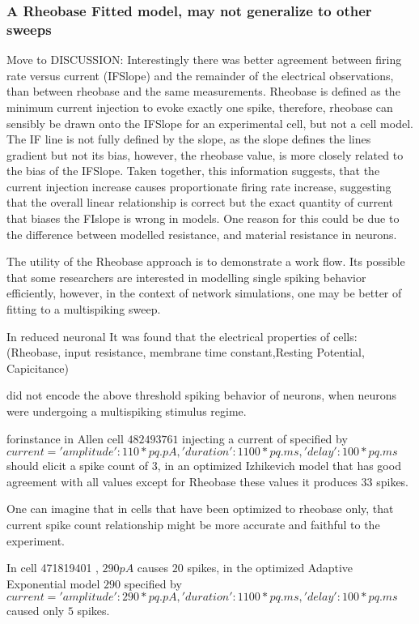 
\subsubsection{A Rheobase Fitted model, may not generalize to other sweeps}
Move to DISCUSSION: Interestingly there was better agreement between firing rate versus current (IFSlope) and the remainder of the electrical observations, than between rheobase and the same measurements. Rheobase is defined as the minimum current injection to evoke exactly one spike, therefore, rheobase can sensibly be drawn onto the IFSlope for an experimental cell, but not a cell model. The IF line is not fully defined by the slope, as the slope defines the lines gradient but not its bias, however, the rheobase value, is more closely related to the bias of the IFSlope. Taken together, this information suggests, that the current injection increase causes proportionate firing rate increase, suggesting that the overall linear relationship is correct but the exact quantity of current that biases the FIslope  is wrong in models. One reason for this could be due to the difference between modelled resistance, and material resistance in neurons.

The utility of the Rheobase approach is to demonstrate a work flow. Its possible that some researchers are interested in modelling single spiking behavior efficiently, however, in the context of network simulations, one may be better of fitting to a multispiking sweep.

In reduced neuronal It was found that the electrical properties of cells:
 (Rheobase, input resistance, membrane time constant,Resting Potential, Capicitance)

 did not encode the above threshold spiking behavior of neurons, when neurons were undergoing a multispiking stimulus regime.

 forinstance in Allen cell $482493761$ injecting a current of 
 specified by $ current = {'amplitude':110*pq.pA,'duration':1100*pq.ms,'delay':100*pq.ms} $
 should elicit a spike count of $3$, in an optimized Izhikevich model that has good agreement with all values except for Rheobase these values it produces $33$ spikes.

One can imagine that in cells that have been optimized to rheobase only, that current spike count relationship might be more  accurate and faithful to the experiment.

In cell 471819401 , $290 pA$ causes $20$ spikes,
in the optimized Adaptive Exponential model $290$
specified by $ current = {'amplitude':290*pq.pA,'duration':1100*pq.ms,'delay':100*pq.ms} $
caused only $5$ spikes. 

